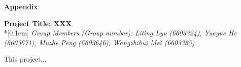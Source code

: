 \documentclass[runningheads]{llncs}
\begin{document}

\begin{flushleft}
\huge{\textbf{Appendix}}
\end{flushleft}
\begin{center}
\Large{\textbf{Project Title:  XXX }} \\*[0.1cm]%
\large{\emph{Group Members (Group number): Liting Lyu (6603324), Yueyue  He (6603671), Muzhe Peng (6603646), Wangzhihui Mei (6603385)}} %
\end{center}


\noindent This project...
\end{document}
